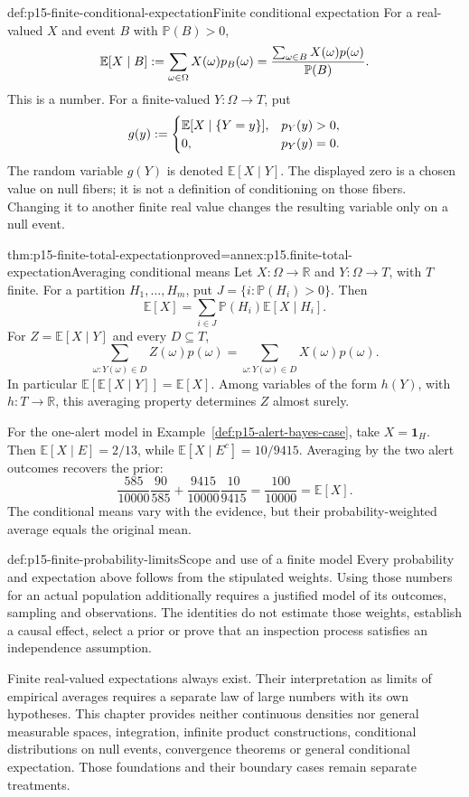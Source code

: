 \begin{hbdefinition}{def:p15-finite-conditional-expectation}{Finite conditional expectation}
For a real-valued \(X\) and event \(B\) with \(\mathbb P(B)>0\),
\[
 \mathbb E[X\mid B]
 \mathrel{:=}\sum_{\omega\in\Omega}X(\omega)p_B(\omega)
 =\frac{\sum_{\omega\in B}X(\omega)p(\omega)}{\mathbb P(B)}.
\]
This is a number. For a finite-valued \(Y:\Omega\to T\), put
\[
 g(y)\mathrel{:=}
 \begin{cases}
 \mathbb E[X\mid\{Y=y\}],&p_Y(y)>0,\\
 0,&p_Y(y)=0.
 \end{cases}
\]
The random variable \(g(Y)\) is denoted \(\mathbb E[X\mid Y]\).
The displayed zero is a chosen value on null fibers; it is not a
definition of conditioning on those fibers. Changing it to another finite
real value changes the resulting variable only on a null event.
\end{hbdefinition}

\begin{hbtheorem}{thm:p15-finite-total-expectation}{proved=annex:p15.finite-total-expectation}{Averaging conditional means}
Let \(X:\Omega\to\mathbb R\) and \(Y:\Omega\to T\), with \(T\)
finite. For a partition \(H_1,\ldots,H_m\), put
\(J=\{i:\mathbb P(H_i)>0\}\). Then
\[
 \mathbb E[X]=\sum_{i\in J}\mathbb P(H_i)\mathbb E[X\mid H_i].
\]
For \(Z=\mathbb E[X\mid Y]\) and every \(D\subseteq T\),
\[
 \sum_{\omega:Y(\omega)\in D} Z(\omega)p(\omega)
 =\sum_{\omega:Y(\omega)\in D} X(\omega)p(\omega).
\]
In particular \(\mathbb E[\mathbb E[X\mid Y]]=\mathbb E[X]\).
Among variables of the form \(h(Y)\), with \(h:T\to\mathbb R\),
this averaging property determines \(Z\) almost surely.
\end{hbtheorem}

For the one-alert model in Example~\ref{def:p15-alert-bayes-case}, take
\(X=\mathbf1_H\). Then
\(\mathbb E[X\mid E]=2/13\), while
\(\mathbb E[X\mid E^c]=10/9415\). Averaging by the two alert outcomes
recovers the prior:
\[
 \frac{585}{10000}\frac{90}{585}
 +\frac{9415}{10000}\frac{10}{9415}
 =\frac{100}{10000}=\mathbb E[X].
\]
The conditional means vary with the evidence, but their probability-weighted
average equals the original mean.

\begin{hbwarning}{def:p15-finite-probability-limits}{Scope and use of a finite model}
Every probability and expectation above follows from the stipulated weights.
Using those numbers for an actual population additionally requires a justified
model of its outcomes, sampling and observations. The identities do not
estimate those weights, establish a causal effect, select a prior or prove
that an inspection process satisfies an independence assumption.

Finite real-valued expectations always exist. Their interpretation as limits
of empirical averages requires a separate law of large numbers with its own
hypotheses. This chapter provides neither continuous densities nor general
measurable spaces, integration, infinite product constructions, conditional
distributions on null events, convergence theorems or general conditional
expectation. Those foundations and their boundary cases remain separate
treatments.
\end{hbwarning}
